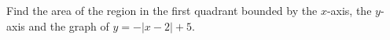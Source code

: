 Find the area of the region in the first quadrant bounded by the $x$-axis, the $y$-axis and the graph of $y=-|x-2|+5$.
